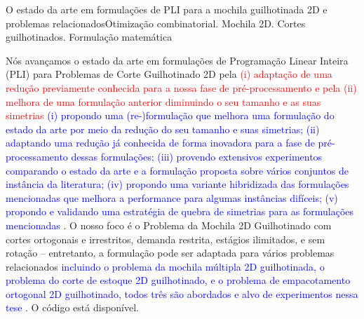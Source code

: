 \documentclass[ppgc,tese,english,formais,babel]{iiufrgs}
\newif\iffinalversion
\newcommand{\newtext}[1]{\iffinalversion%
#1%
\else%
\textcolor{blue}{#1}%
\fi%
}
\newcommand{\oldtext}[1]{\iffinalversion%
\else%
\textcolor{red}{#1}%
\fi%
}
\begin{document}
\begin{englishabstract}{O estado da arte em formulações de PLI para a mochila guilhotinada 2D e problemas relacionados}{Otimização combinatorial. Mochila 2D. Cortes guilhotinados. Formulação matemática}%

Nós avançamos o estado da arte em formulações de Programação Linear Inteira (PLI) para Problemas de Corte Guilhotinado 2D pela \oldtext{(i) adaptação de uma redução previamente conhecida para a nossa fase de pré-processamento e pela (ii) melhora de uma formulação anterior diminuindo o seu tamanho e as suas simetrias}\newtext{(i) propondo uma (re-)formulação que melhora uma formulação do estado da arte por meio da redução do seu tamanho e suas simetrias; (ii) adaptando uma redução já conhecida de forma inovadora para a fase de pré-processamento dessas formulações; (iii) provendo extensivos experimentos comparando o estado da arte e a formulação proposta sobre vários conjuntos de instância da literatura; (iv) propondo uma variante hibridizada das formulações mencionadas que melhora a performance para algumas instâncias difíceis; (v) propondo e validando uma estratégia de quebra de simetrias para as formulações mencionadas}.
O nosso foco é o Problema da Mochila 2D Guilhotinado com cortes ortogonais e irrestritos, demanda restrita, estágios ilimitados, e sem rotação -- entretanto, a formulação pode ser adaptada para vários problemas relacionados \newtext{incluindo o problema da mochila múltipla 2D guilhotinada, o problema do corte de estoque 2D guilhotinado, e o problema de empacotamento ortogonal 2D guilhotinado, todos três são abordados e alvo de experimentos nessa tese}.
O código está disponível.


\end{englishabstract}
\end{document}
